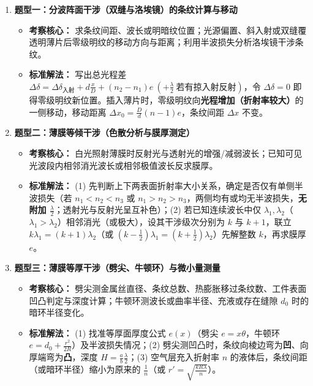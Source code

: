 \documentclass[zihao=5,a4paper,UTF8]{ctexart}
\begin{document}
\begin{typebox}[光的干涉常见题型分析]
\begin{enumerate}
    \item \textbf{题型一：分波阵面干涉（双缝与洛埃镜）的条纹计算与移动}
    \begin{itemize}
        \item \textbf{考察核心：} 求条纹间距、波长或明暗纹位置；光源偏置、斜入射或双缝覆透明薄片后零级明纹的移动方向与距离；利用半波损失分析洛埃镜干涉条纹。
        \item \textbf{标准解法：} 写出总光程差 $\Delta\delta = \Delta\delta_{\text{入射}} + d\frac{x}{D} + (n_2 - n_1)e\ (+ \frac{\lambda}{2}\ \text{若有掠入射反射})$，令 $\Delta\delta = 0$ 即得零级明纹新位置。插入薄片时，零级明纹向\textbf{光程增加（折射率较大）}的一侧移动，移动距离 $\Delta x_0 = \frac{D}{d}(n-1)e$，条纹间距 $\Delta x$ 不变。
    \end{itemize}
    \item \textbf{题型二：薄膜等倾干涉（色散分析与膜厚测定）}
    \begin{itemize}
        \item \textbf{考察核心：} 白光照射薄膜时反射光与透射光的增强/减弱波长；已知可见光波段内相邻消光波长或相邻极值波长反求膜厚。
        \item \textbf{标准解法：} (1) 先判断上下两表面折射率大小关系，确定是否仅有单侧半波损失（若 $n_1 < n_2 < n_3$ 或 $n_1 > n_2 > n_3$，两侧均有或均无半波损失，\textbf{无附加 $\frac{\lambda}{2}$}；透射光与反射光呈互补色）；(2) 若已知连续波长中仅 $\lambda_1, \lambda_2$（$\lambda_1 > \lambda_2$）相邻消光（或极大），设其干涉级次分别为 $k$ 与 $k+1$，联立 $k\lambda_1 = (k+1)\lambda_2$（或 $(k-\frac{1}{2})\lambda_1 = (k+\frac{1}{2})\lambda_2$）先解整数 $k$，再求膜厚 $e$。
    \end{itemize}
    \item \textbf{题型三：薄膜等厚干涉（劈尖、牛顿环）与微小量测量}
    \begin{itemize}
        \item \textbf{考察核心：} 劈尖测金属丝直径、条纹总数、热膨胀移过条纹数、工件表面凹凸判定与深度计算；牛顿环测波长或曲率半径、充液或存在缝隙 $d_0$ 时的暗环半径变化。
        \item \textbf{标准解法：} (1) 找准等厚面厚度公式 $e(x)$（劈尖 $e=x\theta$，牛顿环 $e=d_0 + \frac{r^2}{2R}$）及半波损失情况；(2) 劈尖测凹凸时，条纹向棱边弯为\textbf{凹}、向厚端弯为\textbf{凸}，深度 $H = \frac{a}{b}\frac{\lambda}{2}$；(3) 空气层充入折射率 $n$ 的液体后，条纹间距（或暗环半径）缩小为原来的 $\frac{1}{n}$（或 $r' = \sqrt{\frac{kR\lambda}{n}}$）。

\end{itemize}
\end{enumerate}
\end{typebox}
\end{document}
